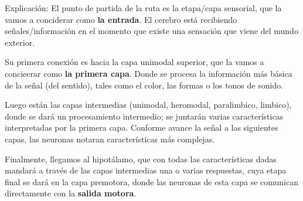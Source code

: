Explicación: El punto de partida de la ruta es la etapa/capa sensorial, que la vamos a conciderar como \textbf{la entrada}. El cerebro está recibiendo señales/información en el momento que existe una sensación que viene del mundo exterior.

Su primera conexión es hacia la capa unimodal superior, que la vamos a concieerar como \textbf{la primera capa}. Donde se procesa la información más básica de la señal (del sentido), tales como el color, las formas o los tonos de sonido.

Luego están las capas intermedias (unimodal, heromodal, paralimbico, limbico), donde se dará un procesamiento intermedio; se juntarán varias características interpretadas por la primera capa. Conforme avance la señal a las siguientes capas, las neuronas notaran características más complejas. 






Finalmente, llegamos al hipotálamo, que con todas las características dadas mandará a través de las capas intermedias una o varias respuestas, cuya etapa final se dará en la capa premotora, donde las neuronas de esta capa se comunican directamente con la \textbf{salida motora}.







